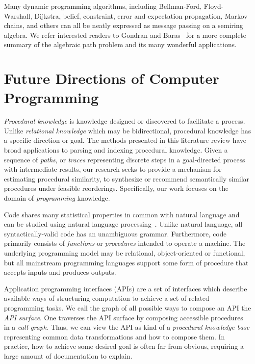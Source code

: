 \documentclass[10pt]{article}
\begin{document}
  \noindent Many dynamic programming algorithms, including Bellman-Ford, Floyd-Warshall, Dijkstra, belief, constraint, error and expectation propagation, Markov chains, and others can all be neatly expressed as message passing on a semiring algebra. We refer interested readers to Gondran and Baras~\cite{gondran2008graphs,baras2010path} for a more complete summary of the algebraic path problem and its many wonderful applications.


\noindent\section{Future Directions of Computer Programming}

\textit{Procedural knowledge} is knowledge designed or discovered to facilitate a process. Unlike \textit{relational knowledge} which may be bidirectional, procedural knowledge has a specific direction or goal. The methods presented in this literature review have broad applications to parsing and indexing procedural knowledge. Given a sequence of \textit{paths}, or \textit{traces} representing discrete steps in a goal-directed process with intermediate results, our research seeks to provide a mechanism for estimating procedural similarity, to synthesize or recommend semantically similar procedures under feasible reorderings. Specifically, our work focuses on the domain of \textit{programming} knowledge.

Code shares many statistical properties in common with natural language and can be studied using natural language processing~\cite{hindle2012naturalness}. Unlike natural language, all syntactically-valid code has an unambiguous grammar. Furthermore, code primarily consists of \textit{functions} or \textit{procedures} intended to operate a machine. The underlying programming model may be relational, object-oriented or functional, but all mainstream programming languages support some form of procedure that accepts inputs and produces outputs.


Application programming interfaces (APIs) are a set of interfaces which describe available ways of structuring computation to achieve a set of related programming tasks. We call the graph of all possible ways to compose an API the \textit{API surface}. One traverses the API surface by composing accessible procedures in a \textit{call graph}. Thus, we can view the API as kind of a \textit{procedural knowledge base} representing common data transformations and how to compose them. In practice, how to achieve some desired goal is often far from obvious, requiring a large amount of documentation to explain.
\end{document}
